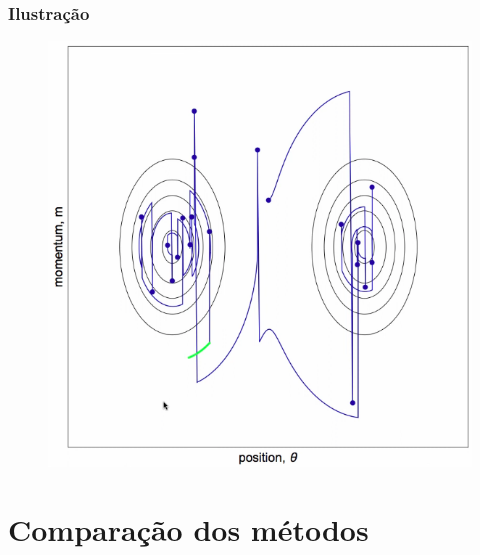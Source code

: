 \documentclass{beamer}
\begin{document}
\begin{frame}
    \frametitle{Ilustração}

    \begin{figure}[h]
        \includegraphics[scale=0.35]{hmc.png} %
    \end{figure}

\end{frame}




\section{Comparação dos métodos}
\end{document}
